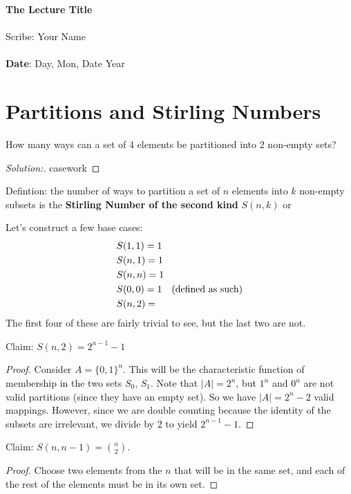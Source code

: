 \documentclass[11pt,twosided]{article}
\def\titlestring{The Lecture Title}
\def\scribestring{Your Name}
\def\datestring{Day, Mon, Date Year}
\begin{document}
\thispagestyle{plain}  %

\noindent
{\LARGE \textbf{\titlestring}}\\\\
%
{\Large Scribe: \scribestring}\\ \\
{\textbf{Date}: \datestring}


\noindent

\section{Partitions and Stirling Numbers}
\begin{problem}{1}
How many ways can a set of 4 elements be partitioned into 2 non-empty sets? 
\end{problem}
\begin{proof}[Solution:]
casework 
\end{proof}

Defintion: the number of ways to partition a set of $n$ elements into $k$ non-empty subsets is the \textbf{Stirling Number of the second kind} $S(n, k)$ or %

Let's construct a few base cases: 
\begin{align*}
	&S(1, 1) = 1 \\
	&S(n, 1) = 1 \\
	&S(n, n) = 1 \\
	&S(0, 0) = 1 \text{\quad (defined as such)} \\
	&S(n, 2) = 
\end{align*}
The first four of these are fairly trivial to see, but the last two are not. 
\begin{problem}{Claim:}
$S(n, 2) = 2^{n-1} - 1$ 
\end{problem}
\begin{proof}
Consider $A = \{ 0, 1 \}^n$. This will be the characteristic function of membership in the two sets $S_0$, $S_1$. Note that $|A| = 2^n$, but $1^n$ and $0^n$ are not valid partitions (since they have an empty set). So we have $|A| = 2^n - 2$ valid mappings. However, since we are double counting because the identity of the subsets are irrelevant, we divide by 2 to yield $2^{n-1} - 1$. 
\end{proof}

\begin{problem}{Claim: }
$S(n, n-1) = \binom{n}{2}$. 
\end{problem}
\begin{proof}
Choose two elements from the $n$ that will be in the same set, and each of the rest of the elements must be in its own set. 
\end{proof}
\end{document}

